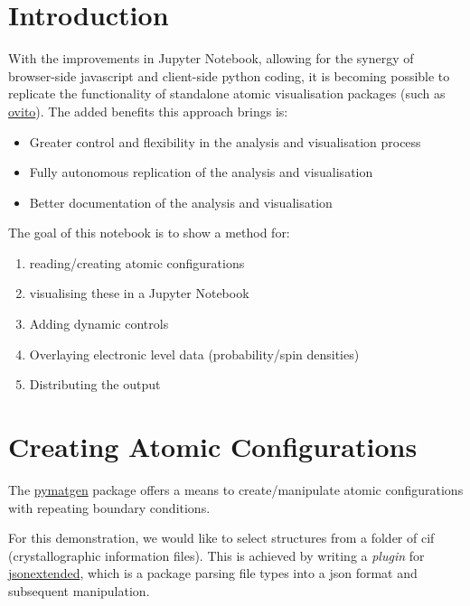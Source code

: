 \documentclass[10pt,parskip=half,
	toc=sectionentrywithdots,
	bibliography=totocnumbered,
	captions=tableheading,numbers=noendperiod]{scrartcl}
\providecommand{\tightlist}{%
  \setlength{\itemsep}{0pt}\setlength{\parskip}{0pt}}
\begin{document}
\section{Introduction}\label{introduction}

With the improvements in Jupyter Notebook, allowing for the synergy of
browser-side javascript and client-side python coding, it is becoming
possible to replicate the functionality of standalone atomic
visualisation packages (such as
\href{https://ovito.org/index.php/about}{ovito}). The added benefits
this approach brings is:

\begin{itemize}
\tightlist
\item
  Greater control and flexibility in the analysis and visualisation
  process
\item
  Fully autonomous replication of the analysis and visualisation
\item
  Better documentation of the analysis and visualisation
\end{itemize}

The goal of this notebook is to show a method for:

\begin{enumerate}
\def\labelenumi{\arabic{enumi}.}
\tightlist
\item
  reading/creating atomic configurations
\item
  visualising these in a Jupyter Notebook
\item
  Adding dynamic controls
\item
  Overlaying electronic level data (probability/spin densities)
\item
  Distributing the output
\end{enumerate}

\section{Creating Atomic
Configurations}\label{creating-atomic-configurations}

The \href{http://pymatgen.org/}{pymatgen} package offers a means to
create/manipulate atomic configurations with repeating boundary
conditions.

For this demonstration, we would like to select structures from a folder
of cif (crystallographic information files). This is achieved by writing
a \emph{plugin} for
\href{https://github.com/chrisjsewell/jsonextended}{jsonextended}, which
is a package parsing file types into a json format and subsequent
manipulation.
\end{document}
